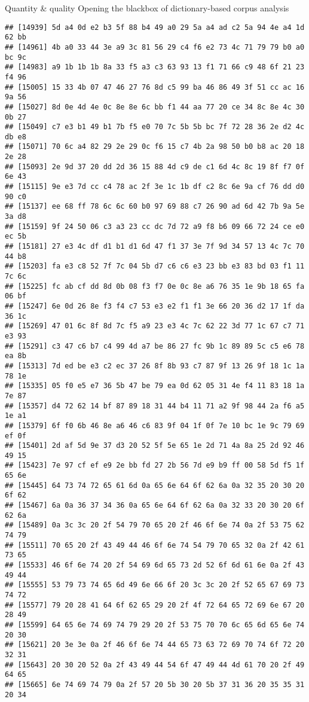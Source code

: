 \documentclass[
  ignorenonframetext,
]{beamer}
\begin{document}
\begin{frame}[fragile]{Quantity \& quality \textbar{} Opening the
blackbox of dictionary-based corpus analysis}
\begin{verbatim}
## [14939] 5d a4 0d e2 b3 5f 88 b4 49 a0 29 5a a4 ad c2 5a 94 4e a4 1d 62 bb
## [14961] 4b a0 33 44 3e a9 3c 81 56 29 c4 f6 e2 73 4c 71 79 79 b0 a0 bc 9c
## [14983] a9 1b 1b 1b 8a 33 f5 a3 c3 63 93 13 f1 71 66 c9 48 6f 21 23 f4 96
## [15005] 15 33 4b 07 47 46 27 76 8d c5 99 ba 46 86 49 3f 51 cc ac 16 9a 56
## [15027] 8d 0e 4d 4e 0c 8e 8e 6c bb f1 44 aa 77 20 ce 34 8c 8e 4c 30 0b 27
## [15049] c7 e3 b1 49 b1 7b f5 e0 70 7c 5b 5b bc 7f 72 28 36 2e d2 4c db e8
## [15071] 70 6c a4 82 29 2e 29 0c f6 15 c7 4b 2a 98 50 b0 b8 ac 20 18 2e 28
## [15093] 2e 9d 37 20 dd 2d 36 15 88 4d c9 de c1 6d 4c 8c 19 8f f7 0f 6e 43
## [15115] 9e e3 7d cc c4 78 ac 2f 3e 1c 1b df c2 8c 6e 9a cf 76 dd d0 90 c0
## [15137] ee 68 ff 78 6c 6c 60 b0 97 69 88 c7 26 90 ad 6d 42 7b 9a 5e 3a d8
## [15159] 9f 24 50 06 c3 a3 23 cc dc 7d 72 a9 f8 b6 09 66 72 24 ce e0 ec 5b
## [15181] 27 e3 4c df d1 b1 d1 6d 47 f1 37 3e 7f 9d 34 57 13 4c 7c 70 44 b8
## [15203] fa e3 c8 52 7f 7c 04 5b d7 c6 c6 e3 23 bb e3 83 bd 03 f1 11 7c 6c
## [15225] fc ab cf dd 8d 0b 08 f3 f7 0e 0c 8e a6 76 35 1e 9b 18 65 fa 06 bf
## [15247] 6e 0d 26 8e f3 f4 c7 53 e3 e2 f1 f1 3e 66 20 36 d2 17 1f da 36 1c
## [15269] 47 01 6c 8f 8d 7c f5 a9 23 e3 4c 7c 62 22 3d 77 1c 67 c7 71 e3 93
## [15291] c3 47 c6 b7 c4 99 4d a7 be 86 27 fc 9b 1c 89 89 5c c5 e6 78 ea 8b
## [15313] 7d ed be e3 c2 ec 37 26 8f 8b 93 c7 87 9f 13 26 9f 18 1c 1a 78 1e
## [15335] 05 f0 e5 e7 36 5b 47 be 79 ea 0d 62 05 31 4e f4 11 83 18 1a 7e 87
## [15357] d4 72 62 14 bf 87 89 18 31 44 b4 11 71 a2 9f 98 44 2a f6 a5 1e a1
## [15379] 6f f0 6b 46 8e a6 46 c6 83 9f 04 1f 0f 7e 10 bc 1e 9c 79 69 ef 0f
## [15401] 2d af 5d 9e 37 d3 20 52 5f 5e 65 1e 2d 71 4a 8a 25 2d 92 46 49 15
## [15423] 7e 97 cf ef e9 2e bb fd 27 2b 56 7d e9 b9 ff 00 58 5d f5 1f 65 6e
## [15445] 64 73 74 72 65 61 6d 0a 65 6e 64 6f 62 6a 0a 32 35 20 30 20 6f 62
## [15467] 6a 0a 36 37 34 36 0a 65 6e 64 6f 62 6a 0a 32 33 20 30 20 6f 62 6a
## [15489] 0a 3c 3c 20 2f 54 79 70 65 20 2f 46 6f 6e 74 0a 2f 53 75 62 74 79
## [15511] 70 65 20 2f 43 49 44 46 6f 6e 74 54 79 70 65 32 0a 2f 42 61 73 65
## [15533] 46 6f 6e 74 20 2f 54 69 6d 65 73 2d 52 6f 6d 61 6e 0a 2f 43 49 44
## [15555] 53 79 73 74 65 6d 49 6e 66 6f 20 3c 3c 20 2f 52 65 67 69 73 74 72
## [15577] 79 20 28 41 64 6f 62 65 29 20 2f 4f 72 64 65 72 69 6e 67 20 28 49
## [15599] 64 65 6e 74 69 74 79 29 20 2f 53 75 70 70 6c 65 6d 65 6e 74 20 30
## [15621] 20 3e 3e 0a 2f 46 6f 6e 74 44 65 73 63 72 69 70 74 6f 72 20 32 31
## [15643] 20 30 20 52 0a 2f 43 49 44 54 6f 47 49 44 4d 61 70 20 2f 49 64 65
## [15665] 6e 74 69 74 79 0a 2f 57 20 5b 30 20 5b 37 31 36 20 35 35 31 20 34

\end{verbatim}
\end{frame}
\end{document}
